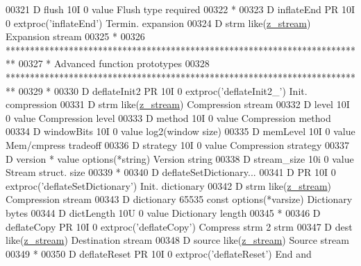 \begin{DoxyCode}
00321      D  flush                        10I 0 value                                Flush type required
00322       *
00323      D inflateEnd      PR            10I 0 extproc('inflateEnd')                Termin. expansion
00324      D  strm                               like(\hyperlink{structz__stream__s}{z\_stream})                       Expansion stream
00325       *
00326       **************************************************************************
00327       *                        Advanced function prototypes
00328       **************************************************************************
00329       *
00330      D deflateInit2    PR            10I 0 extproc('deflateInit2\_')             Init. compression
00331      D  strm                               like(\hyperlink{structz__stream__s}{z\_stream})                       Compression stream
00332      D  level                        10I 0 value                                Compression level
00333      D  method                       10I 0 value                                Compression method
00334      D  windowBits                   10I 0 value                                log2(window size)
00335      D  memLevel                     10I 0 value                                Mem/cmpress tradeoff
00336      D  strategy                     10I 0 value                                Compression strategy
00337      D  version                        *   value options(*\textcolor{keywordtype}{string})               Version \textcolor{keywordtype}{string}
00338      D  stream\_size                  10i 0 value                                Stream struct. size
00339       *
00340      D deflateSetDictionary...
00341      D                 PR            10I 0 extproc('deflateSetDictionary')      Init. dictionary
00342      D  strm                               like(\hyperlink{structz__stream__s}{z\_stream})                       Compression stream
00343      D  dictionary                65535    const options(*varsize)              Dictionary bytes
00344      D  dictLength                   10U 0 value                                Dictionary length
00345       *
00346      D deflateCopy     PR            10I 0 extproc('deflateCopy')               Compress strm 2 strm
00347      D  dest                               like(\hyperlink{structz__stream__s}{z\_stream})                       Destination stream
00348      D  source                             like(\hyperlink{structz__stream__s}{z\_stream})                       Source stream
00349       *
00350      D deflateReset    PR            10I 0 extproc('deflateReset')              End and 

\end{DoxyCode}
